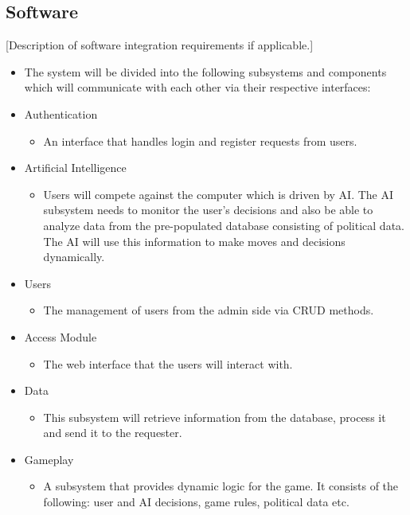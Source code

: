 \documentclass{article}
\begin{document}
    \subsection{Software}
    [Description of software integration requirements if applicable.]
    \begin{itemize}
    \item The system will be divided into the following subsystems and components which will communicate with each other via their respective interfaces:

    	\item Authentication  
	    \begin{itemize}
				\item An interface that handles login and register requests from users.
		\end{itemize}

		\item Artificial Intelligence 
   		\begin{itemize}
				\item Users will compete against the computer which is driven by AI. The AI subsystem needs to monitor the user's decisions and also be able to analyze data from the pre-populated database consisting of political data. The AI will use this information to make moves and decisions dynamically.
		\end{itemize}

		\item Users 
		\begin{itemize}
				\item The management of users from the admin side via CRUD methods.   		
		\end{itemize}

		\item Access Module 
		\begin{itemize}
				\item The web interface that the users will interact with.		
		\end{itemize}

		\item Data
		\begin{itemize}
				\item This subsystem will retrieve information from the database, process it and send it to the requester.
		\end{itemize}

		\item Gameplay
		\begin{itemize}
				\item A subsystem that provides dynamic logic for the game. It consists of the following: user and AI decisions, game rules, political data etc.
		\end{itemize}
	\end{itemize}
\end{document}
